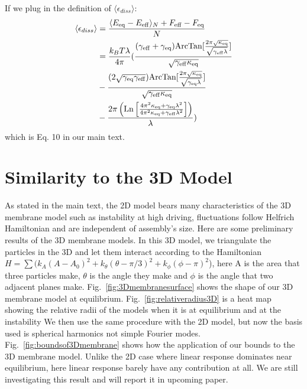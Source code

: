 \documentclass[amsmath,preprintnumbers,10pt,nofootinbib,prl,twocolumn]{revtex4-1}
\begin{document}
If we plug in the definition of $\langle\epsilon_{diss}\rangle:$
\begin{equation}
    \begin{split}
        \langle\epsilon_{diss}\rangle&=\frac{\langle E_{\rm{eq}}-E_{\rm{eff}}\rangle_N+F_{\rm{eff}}-F_{\rm{eq}}}{N}\\
        &=\frac{k_BT\lambda}{4\pi}( \frac{(\gamma_{\rm eff}+\gamma_{\rm eq})\rm{ArcTan}[\frac{2\pi\sqrt{\kappa_{\rm eq}}}{\sqrt{\gamma_{\rm eff}\lambda}}]}{\sqrt{\gamma_{\rm eff}\kappa_{\rm eq}}}\\
        &- \frac{(2\sqrt{\gamma_{\rm eq}\gamma_{\rm eff}})\rm{ArcTan}[\frac{2\pi\sqrt{\kappa_{\rm eq}}}{\sqrt{\gamma_{\rm eq}\lambda}}]}{\sqrt{\gamma_{\rm eff}\kappa_{\rm eq}}} \\
        & -\frac{2\pi\left(\rm{Ln}\left[\frac{4\pi^2\kappa_{\rm eq}+\gamma_{\rm eq}\lambda^2}{4\pi^2\kappa_{\rm eq}+\gamma_{\rm eff}\lambda^2}\right]\right)}{\lambda})
    \end{split}
\end{equation}
which is Eq. 10 in our main text.
\section{Similarity to the 3D Model}
As stated in the main text, the 2D model bears many characteristics of the 3D membrane model such as instability at high driving, fluctuations follow Helfrich Hamiltonian and are independent of assembly's size. Here are some preliminary results of the 3D membrane models. In this 3D model, we triangulate the particles in the 3D and let them interact according to the Hamiltonian $H=\sum (k_A(A-A_0)^2 + k_\theta (\theta-\pi/3)^2 + k_\phi (\phi-\pi)^2$), here A is the area that three particles make, $\theta$ is the angle they make and $\phi$ is the angle that two adjacent planes make.
Fig.~\ref{fig:3Dmembranesurface} shows the shape of our 3D membrane model at equilibrium. Fig.~\ref{fig:relativeradius3D} is a heat map showing the relative radii of the models when it is at equilibrium and at the instability
We then use the same procedure with the 2D model, but now the basis used is spherical harmonics not simple Fourier modes. Fig.~\ref{fig:boundsof3Dmembrane} shows how the application of our bounds to the 3D membrane model. Unlike the 2D case where linear response dominates near equilibrium, here linear response barely have any contribution at all. We are still investigating this result and will report it in upcoming paper.
\end{document}
